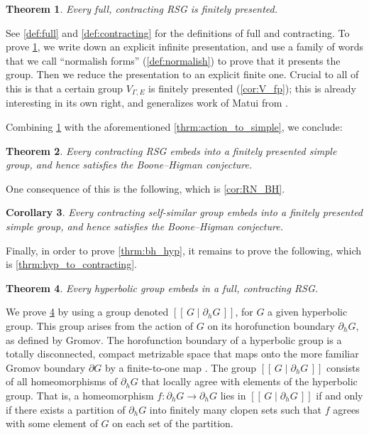 \documentclass[11pt,letterpaper]{amsart}
\newtheorem{theorem}{Theorem}[section]
\newtheorem{corollary}[theorem]{Corollary}
\theoremstyle{definition}
\begin{document}
{\renewcommand*{\thetheorem}{\Alph{theorem}}
\begin{theorem}\label{thrm:FPTheorem}
Every full, contracting RSG is finitely presented.
\end{theorem}}

See \cref{def:full} and \cref{def:contracting} for the definitions of full and contracting. To prove \cref{thrm:FPTheorem}, we write down an explicit infinite presentation, and use a family of words that we call ``normalish forms'' (\cref{def:normalish}) to prove that it presents the group. Then we reduce the presentation to an explicit finite one. Crucial to all of this is that a certain group $V_{\Gamma,E}$ is finitely presented (\cref{cor:V_fp}); this is already interesting in its own right, and generalizes work of Matui from \cite{Matui15}.

Combining \cref{thrm:FPTheorem} with the aforementioned \cref{thrm:action_to_simple}, we conclude:

{\renewcommand*{\thetheorem}{\Alph{theorem}}
\begin{theorem}\label{thrm:rsg_to_simple}
Every contracting RSG embeds into a finitely presented simple group, and hence satisfies the Boone--Higman conjecture.
\end{theorem}}

One consequence of this is the following, which is \cref{cor:RN_BH}.

{\renewcommand*{\thetheorem}{\Alph{theorem}}
\begin{corollary}\label{cor:ss_embed}
Every contracting self-similar group embeds into a finitely presented simple group, and hence satisfies the Boone--Higman conjecture.
\end{corollary}}

Finally, in order to prove \cref{thrm:bh_hyp}, it remains to prove the following, which is \cref{thrm:hyp_to_contracting}.

{\renewcommand*{\thetheorem}{\Alph{theorem}}
\begin{theorem}\label{thrm:hyp_embed}
Every hyperbolic group embeds in a full, contracting RSG.
\end{theorem}}

We prove \cref{thrm:hyp_embed} by using a group denoted $[[\,G\mid \partial_h G\,]]$, for $G$ a given hyperbolic group. This group arises from the action of $G$ on its horofunction boundary $\partial_h G$, as defined by Gromov.  The horofunction boundary of a hyperbolic group is a totally disconnected, compact metrizable space that maps onto the more familiar Gromov boundary $\partial G$ by a finite-to-one map \cite{WeWi,perego2023rationality}. The group $[[\,G\mid\partial_h G\,]]$ consists of all homeomorphisms of $\partial_h G$ that locally agree with elements of the hyperbolic group.  That is, a homeomorphism $f\colon \partial_h G\to \partial_h G$ lies in $[[\,G\mid \partial_h G\,]]$ if and only if there exists a partition of $\partial_h G$ into finitely many clopen sets such that $f$ agrees with some element of $G$ on each set of the partition.
\end{document}
